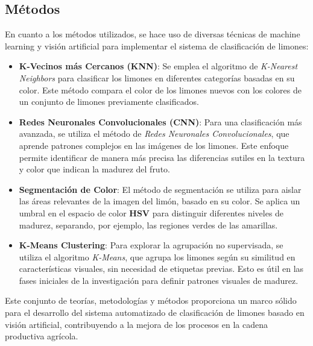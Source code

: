 \subsection{Métodos}

En cuanto a los métodos utilizados, se hace uso de diversas técnicas de machine learning y visión artificial para implementar el sistema de clasificación de limones:

\begin{itemize}
    \item \textbf{K-Vecinos más Cercanos (KNN)}: Se emplea el algoritmo de \textit{K-Nearest Neighbors} para clasificar los limones en diferentes categorías basadas en su color. Este método compara el color de los limones nuevos con los colores de un conjunto de limones previamente clasificados.
    
    \item \textbf{Redes Neuronales Convolucionales (CNN)}: Para una clasificación más avanzada, se utiliza el método de \textit{Redes Neuronales Convolucionales}, que aprende patrones complejos en las imágenes de los limones. Este enfoque permite identificar de manera más precisa las diferencias sutiles en la textura y color que indican la madurez del fruto.
    
    \item \textbf{Segmentación de Color}: El método de segmentación se utiliza para aislar las áreas relevantes de la imagen del limón, basado en su color. Se aplica un umbral en el espacio de color \textbf{HSV} para distinguir diferentes niveles de madurez, separando, por ejemplo, las regiones verdes de las amarillas.
    
    \item \textbf{K-Means Clustering}: Para explorar la agrupación no supervisada, se utiliza el algoritmo \textit{K-Means}, que agrupa los limones según su similitud en características visuales, sin necesidad de etiquetas previas. Esto es útil en las fases iniciales de la investigación para definir patrones visuales de madurez.
\end{itemize}

Este conjunto de teorías, metodologías y métodos proporciona un marco sólido para el desarrollo del sistema automatizado de clasificación de limones basado en visión artificial, contribuyendo a la mejora de los procesos en la cadena productiva agrícola.
